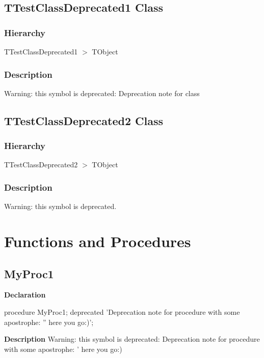 \documentclass{report}
\begin{document}
\subsection*{TTestClassDeprecated1 Class}
\subsubsection*{\large{\textbf{Hierarchy}}\normalsize\hspace{1ex}\hfill}
TTestClassDeprecated1 {$>$} TObject
\subsubsection*{\large{\textbf{Description}}\normalsize\hspace{1ex}\hfill}
Warning: this symbol is deprecated: Deprecation note for class

\subsection*{TTestClassDeprecated2 Class}
\subsubsection*{\large{\textbf{Hierarchy}}\normalsize\hspace{1ex}\hfill}
TTestClassDeprecated2 {$>$} TObject
\subsubsection*{\large{\textbf{Description}}\normalsize\hspace{1ex}\hfill}
Warning: this symbol is deprecated.

\section{Functions and Procedures}
\subsection*{MyProc1}
\begin{list}{}{
\setlength{\itemindent}{0cm}
\setlength{\listparindent}{0cm}
\setlength{\leftmargin}{\evensidemargin}
\addtolength{\leftmargin}{\tmplength}
\settowidth{\labelsep}{X}
\addtolength{\leftmargin}{\labelsep}
\setlength{\labelwidth}{\tmplength}
}
\begin{flushleft}
\item[\textbf{Declaration}\hfill]
\begin{ttfamily}
procedure MyProc1; deprecated 'Deprecation note for procedure with some apostrophe: '' here you go:)';\end{ttfamily}


\end{flushleft}
\par
\item[\textbf{Description}]
Warning: this symbol is deprecated: Deprecation note for procedure with some apostrophe: ' here you go:)

 

\end{list}
\end{document}
